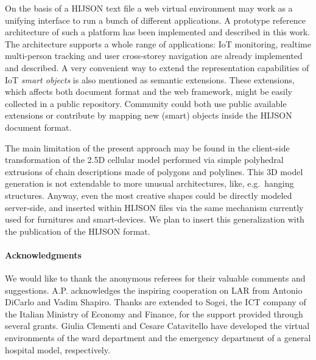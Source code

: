 \documentclass[]{egpubl}
\begin{document}
On the basis of a HIJSON text file a  web virtual
environment may work as a unifying interface to run a bunch of
different applications. A prototype reference architecture of such a platform has been
 implemented and described in this work. The architecture supports a whole
range of applications: IoT monitoring, realtime multi-person tracking and user
cross-storey navigation are already implemented and described. A very
convenient way to extend the representation capabilities of IoT \emph{smart objects} is
also mentioned as semantic extensions. These extensions, which affects both
document format and the web framework, might be easily collected in a public
repository. Community could both use public available extensions or contribute
by mapping new (smart) objects inside the HIJSON document format.

The main limitation of the present approach may be found in the client-side transformation of the 2.5D cellular model performed via simple polyhedral extrusions of chain descriptions made of polygons and polylines. This 3D model generation is not extendable to more unusual architectures, like, e.g.~hanging structures. Anyway, even the most creative shapes could be directly modeled server-side, and inserted within HIJSON files via the same mechanism currently used for furnitures and smart-devices. We plan to insert this generalization with the publication of the HIJSON format.


\paragraph*{Acknowledgments}

We would like to thank the anonymous referees for their valuable comments and suggestions.
A.P. acknowledges the inspiring cooperation on LAR from Antonio DiCarlo and Vadim Shapiro. Thanks are extended to Sogei, the ICT company of the Italian Ministry of Economy and Finance, for the support provided through several grants. Giulia Clementi and Cesare Catavitello have developed the virtual environments of the ward department and the emergency department of a general hospital model, respectively. 


\balance

%



\end{document}
